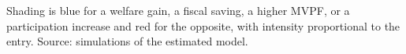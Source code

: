 \begin{table}[!tp]
\begin{threeparttable}
\begin{tablenotes}[flushleft]
Shading is blue for a welfare gain, a fiscal saving, a higher MVPF, or a participation increase and red for the opposite, with intensity proportional to the entry. Source: simulations of the estimated model.
\end{tablenotes}
\end{threeparttable}
\end{table}
